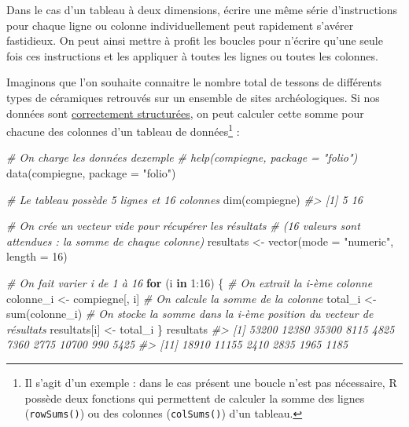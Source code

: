 \documentclass[
  french,
]{scrbook}
\newenvironment{Shaded}{\begin{snugshade}}{\end{snugshade}}
\newcommand{\AttributeTok}[1]{\textcolor[rgb]{0.77,0.63,0.00}{#1}}
\newcommand{\CommentTok}[1]{\textcolor[rgb]{0.56,0.35,0.01}{\textit{#1}}}
\newcommand{\ControlFlowTok}[1]{\textcolor[rgb]{0.13,0.29,0.53}{\textbf{#1}}}
\newcommand{\DecValTok}[1]{\textcolor[rgb]{0.00,0.00,0.81}{#1}}
\newcommand{\FunctionTok}[1]{\textcolor[rgb]{0.00,0.00,0.00}{#1}}
\newcommand{\NormalTok}[1]{#1}
\newcommand{\OtherTok}[1]{\textcolor[rgb]{0.56,0.35,0.01}{#1}}
\newcommand{\SpecialCharTok}[1]{\textcolor[rgb]{0.00,0.00,0.00}{#1}}
\newcommand{\StringTok}[1]{\textcolor[rgb]{0.31,0.60,0.02}{#1}}
\begin{document}
Dans le cas d'un tableau à deux dimensions, écrire une même série d'instructions pour chaque ligne ou colonne individuellement peut rapidement s'avérer fastidieux. On peut ainsi mettre à profit les boucles pour n'écrire qu'une seule fois ces instructions et les appliquer à toutes les lignes ou toutes les colonnes.

Imaginons que l'on souhaite connaitre le nombre total de tessons de différents types de céramiques retrouvés sur un ensemble de sites archéologiques. Si nos données sont \protect\hyperlink{data-tidy}{correctement structurées}, on peut calculer cette somme pour chacune des colonnes d'un tableau de données\footnote{Il s'agit d'un exemple : dans le cas présent une boucle n'est pas nécessaire, R possède deux fonctions qui permettent de calculer la somme des lignes (\texttt{rowSums()}) ou des colonnes (\texttt{colSums()}) d'un tableau.} :

\begin{Shaded}
\begin{Highlighting}[]
\CommentTok{\# On charge les données d\textquotesingle{}exemple}
\CommentTok{\# help(compiegne, package = "folio")}
\FunctionTok{data}\NormalTok{(compiegne, }\AttributeTok{package =} \StringTok{"folio"}\NormalTok{)}

\CommentTok{\# Le tableau possède 5 lignes et 16 colonnes}
\FunctionTok{dim}\NormalTok{(compiegne)}
\CommentTok{\#\textgreater{} [1]  5 16}

\CommentTok{\# On crée un vecteur vide pour récupérer les résultats}
\CommentTok{\# (16 valeurs sont attendues : la somme de chaque colonne)}
\NormalTok{resultats }\OtherTok{\textless{}{-}} \FunctionTok{vector}\NormalTok{(}\AttributeTok{mode =} \StringTok{"numeric"}\NormalTok{, }\AttributeTok{length =} \DecValTok{16}\NormalTok{)}

\CommentTok{\# On fait varier i de 1 à 16}
\ControlFlowTok{for}\NormalTok{ (i }\ControlFlowTok{in} \DecValTok{1}\SpecialCharTok{:}\DecValTok{16}\NormalTok{) \{}
  \CommentTok{\# On extrait la i{-}ème colonne}
\NormalTok{  colonne\_i }\OtherTok{\textless{}{-}}\NormalTok{ compiegne[, i]}
  \CommentTok{\# On calcule la somme de la colonne}
\NormalTok{  total\_i }\OtherTok{\textless{}{-}} \FunctionTok{sum}\NormalTok{(colonne\_i)}
  \CommentTok{\# On stocke la somme dans la i{-}ème position du vecteur de résultats}
\NormalTok{  resultats[i] }\OtherTok{\textless{}{-}}\NormalTok{ total\_i}
\NormalTok{\}}
\NormalTok{resultats}
\CommentTok{\#\textgreater{}  [1] 53200 12380 35300  8115  4825  7360  2775 10700   990  5425}
\CommentTok{\#\textgreater{} [11] 18910 11155  2410  2835  1965  1185}
\end{Highlighting}
\end{Shaded}
\end{document}
